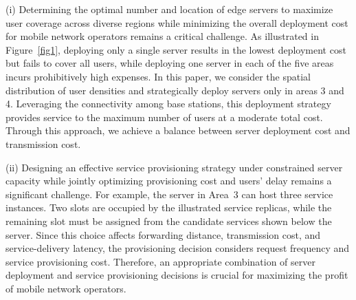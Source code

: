 \documentclass[10pt, conference, letterpaper]{IEEEtran}
\newenvironment{revision}{\begingroup\color{blue}}{\endgroup}
\newenvironment{revision}{\begingroup}{\endgroup}
\begin{document}
(i) Determining the optimal number and location of edge servers to maximize user coverage across diverse regions while minimizing the overall deployment cost for mobile network operators remains a critical challenge. As illustrated in Figure~\ref{fig1}, deploying only a single server results in the lowest deployment cost but fails to cover all users, while deploying one server in each of the five areas incurs prohibitively high expenses. In this paper, we consider the spatial distribution of user densities and strategically deploy servers only in areas 3 and 4. Leveraging the connectivity among base stations, this deployment strategy provides service to the maximum number of users at a moderate total cost. Through this approach, we achieve a balance between server deployment cost and transmission cost.\par
\begin{revision}
(ii) Designing an effective service provisioning strategy under constrained server capacity while jointly optimizing provisioning cost and users' delay remains a significant challenge. For example, the server in Area~3 can host three service instances. Two slots are occupied by the illustrated service replicas, while the remaining slot must be assigned from the candidate services shown below the server. Since this choice affects forwarding distance, transmission cost, and service-delivery latency, the provisioning decision considers request frequency and service provisioning cost. Therefore, an appropriate combination of server deployment and service provisioning decisions is crucial for maximizing the profit of mobile network operators.
\end{revision}
\end{document}
